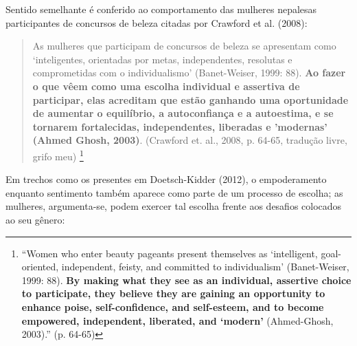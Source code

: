 Sentido semelhante é conferido ao comportamento das mulheres nepalesas participantes de concursos de beleza citadas por Crawford et al. (2008):

\begin{quote}
    As mulheres que participam de concursos de beleza se apresentam como ‘inteligentes, orientadas por metas, independentes, resolutas e comprometidas com o individualismo’ (Banet-Weiser, 1999: 88). \textbf{Ao fazer o que vêem como uma escolha individual e assertiva de participar, elas acreditam que estão ganhando uma oportunidade de aumentar o equilíbrio, a autoconfiança e a autoestima, e se tornarem fortalecidas, independentes, liberadas e 'modernas' (Ahmed Ghosh, 2003)}. (Crawford et. al., 2008, p. 64-65, tradução livre, grifo meu) \footnote{``Women who enter beauty pageants present themselves as ‘intelligent, goal-oriented, independent, feisty, and committed to individualism’ (Banet-Weiser, 1999: 88). \textbf{By making what they see as an individual, assertive choice to participate, they believe they are gaining an opportunity to enhance poise, self-confidence, and self-esteem, and to become empowered, independent, liberated, and ‘modern’} (Ahmed-Ghosh, 2003).'' (p. 64-65)}
\end{quote}

Em trechos como os presentes em Doetsch-Kidder (2012), o empoderamento enquanto sentimento também aparece como parte de um processo de escolha; as mulheres, argumenta-se, podem exercer tal escolha frente aos desafios colocados ao seu gênero:

